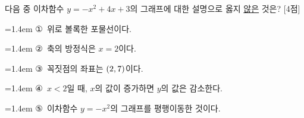 다음 중 이차함수 $y=-x^2+4x+3$의 그래프에 대한 설명으로 옳지 \underline{않은} 것은? \mbox{[4점]}
\par\medskip\par\noindent\hangindent=1.4em {\small ①}\ 위로 볼록한 포물선이다.\par\noindent\hangindent=1.4em {\small ②}\ 축의 방정식은 $x=2$이다.\par\noindent\hangindent=1.4em {\small ③}\ 꼭짓점의 좌표는 $(2{,}\mkern3mu 7)$이다.\par\noindent\hangindent=1.4em {\small ④}\ $x<2$일 때, $x$의 값이 증가하면 $y$의 값은 감소한다.\par\noindent\hangindent=1.4em {\small ⑤}\ 이차함수 $y=-x^2$의 그래프를 평행이동한 것이다.\par\medskip
